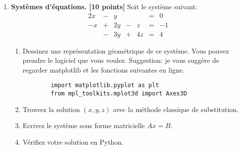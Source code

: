 \documentclass{article}
\begin{document}
\begin{enumerate}
\vspace{1cm}
\item {\bf Systèmes d'équations. [10 points]} Soit le système suivant:
$$
\begin{array}{ccccccc}
2x & - & y  &   &    & = &  0 \\
-x & + & 2y & - & z  & = & -1 \\
   & - & 3y & + & 4z & = &  4
\end{array}
$$
\begin{enumerate}
 \item Dessinez une représentation géométrique de ce système. Vous
   pouvez prendre le logiciel que vous voulez. Suggestion: je vous
   suggère de regarder matplotlib et les fonctions suivantes en ligne.
\begin{verbatim}
        import matplotlib.pyplot as plt 
        from mpl_toolkits.mplot3d import Axes3D
\end{verbatim}
 \item Trouvez la solution $(x,y,z)$ avec la méthode 
   classique de substitution.
 \item Ecrivez le système sous forme matricielle $A x = B$.
 \item Vérifiez votre solution en Python.
\end{enumerate}
      



\vspace{1cm}


\end{enumerate}
\end{document}
